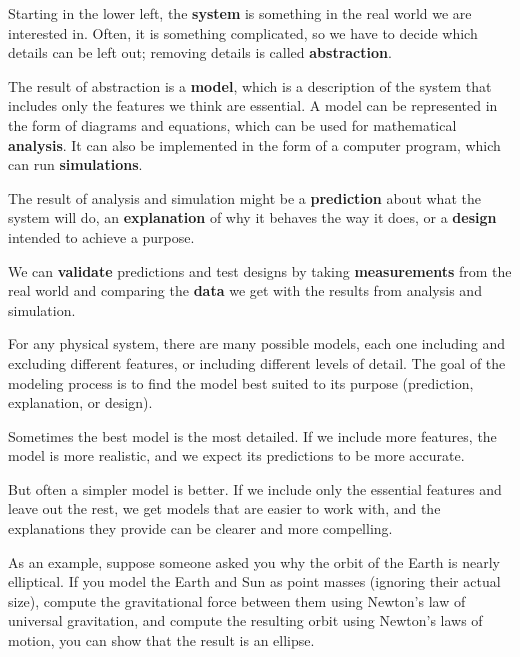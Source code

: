 \documentclass[12pt]{book}
\theoremstyle{exercise}
\begin{document}
Starting in the lower left, the {\bf system} is something in the real world we are interested in.  Often, it is something complicated, so we have to decide which details can be left out; removing details is called {\bf abstraction}.


The result of abstraction is a {\bf model}, which is a description of the system that includes only the features we think are essential.  A model can be represented in the form of diagrams and equations, which can be used for mathematical {\bf analysis}.  It can also be implemented in the form of a computer program, which can run {\bf simulations}.


The result of analysis and simulation might be a {\bf prediction} about what the system will do, an {\bf explanation} of why it behaves the way it does, or a {\bf design} intended to achieve a purpose.


We can {\bf validate} predictions and test designs by taking {\bf measurements} from the real world and comparing the {\bf data} we get with the results from analysis and simulation. 


For any physical system, there are many possible models, each one including and excluding different features, or including different levels of detail.  The goal of the modeling process is to find the model best suited to its purpose (prediction, explanation, or design).


Sometimes the best model is the most detailed.  If we include more features, the model is more realistic, and we expect its predictions to be more accurate.


But often a simpler model is better.  If we include only the essential features and leave out the rest, we get models that are easier to work with, and the explanations they provide can be clearer and more compelling.


As an example, suppose someone asked you why the orbit of the Earth is nearly elliptical.  If you model the Earth and Sun as point masses (ignoring their actual size), compute the gravitational force between them using Newton's law of universal gravitation, and compute the resulting orbit using Newton's laws of motion, you can show that the result is an ellipse.
\end{document}
